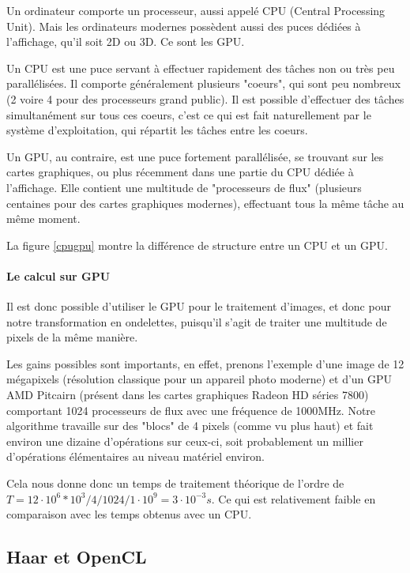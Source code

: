 \documentclass{article}
\begin{document}
Un ordinateur comporte un processeur, aussi appelé CPU (Central Processing Unit). Mais les ordinateurs modernes possèdent aussi des puces dédiées à l'affichage, qu'il soit 2D ou 3D. Ce sont les GPU.

Un CPU est une puce servant à effectuer rapidement des tâches non ou très peu parallélisées. Il comporte généralement plusieurs "coeurs", qui sont peu nombreux (2 voire 4 pour des processeurs grand public). Il est possible d'effectuer des tâches simultanément sur tous ces coeurs, c'est ce qui est fait naturellement par le système d'exploitation, qui répartit les tâches entre les coeurs. 

Un GPU, au contraire, est une puce fortement parallélisée, se trouvant sur les cartes graphiques, ou plus récemment dans une partie du CPU dédiée à l'affichage. Elle contient une multitude de "processeurs de flux" (plusieurs centaines pour des cartes graphiques modernes), effectuant tous la même tâche au même moment.

La figure \ref{cpugpu} montre la différence de structure entre un CPU et un GPU.


\paragraph{Le calcul sur GPU}

Il est donc possible d'utiliser le GPU pour le traitement d'images, et donc pour notre transformation en ondelettes, puisqu'il s'agit de traiter une multitude de pixels de la même manière.

Les gains possibles sont importants, en effet, prenons l'exemple d'une image de 12 mégapixels (résolution classique pour un appareil photo moderne) et d'un GPU AMD Pitcairn (présent dans les cartes graphiques Radeon HD séries 7800) comportant 1024 processeurs de flux avec une fréquence de 1000MHz. Notre algorithme travaille sur des "blocs" de 4 pixels (comme vu plus haut) et fait environ une dizaine d'opérations sur ceux-ci, soit probablement un millier d'opérations élémentaires au niveau matériel environ.

Cela nous donne donc un temps de traitement théorique de l'ordre de $T = 12\cdot{}10^6 * 10^3 / 4 / 1024 / 1\cdot{}10^9 = 3\cdot{}10^{-3} s$. Ce qui est relativement faible en comparaison avec les temps obtenus avec un CPU.

\subsection{Haar et OpenCL}
\end{document}
